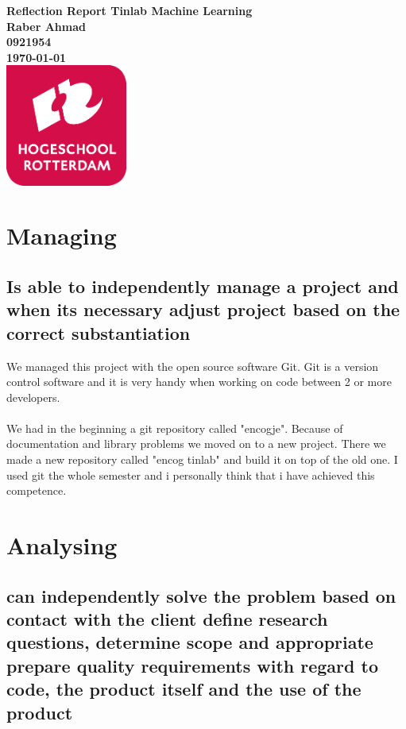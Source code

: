 \documentclass{article}
\begin{document}
\sffamily
\begin{titlepage}
  \centering
    \vfill
    {\bfseries\Huge
      Reflection Report Tinlab Machine Learning \\
        \vskip2cm
      }
      {\bfseries\Large
        Raber Ahmad\\
      }
      {
        \bfseries\normalsize
        0921954\\
        \vskip1cm
        \today\\
    }    
    \vfill
    \includegraphics[width=4cm]{logohr.png} %
    \vfill
    \vfill
\end{titlepage}
\newpage
\tableofcontents
\newpage

\section{Managing}

\subsection{Is able to independently manage a project and when its necessary adjust project based on the correct substantiation}

We managed this project with the open source software Git. Git is a version control software and it is very handy when working on code between 2 or more developers. 
\\\\
We had in the beginning a git repository called "encogje". Because of documentation and library problems we moved on to a new project. There we made a new repository called "encog tinlab" and build it on top of the old one. I used git the whole semester and i personally think that i have achieved this competence.
\section{Analysing}
\subsection{can independently solve the problem based on contact with the client
define research questions, determine scope and appropriate
prepare quality requirements with regard to code, the product itself and the
use of the product}
\end{document}
